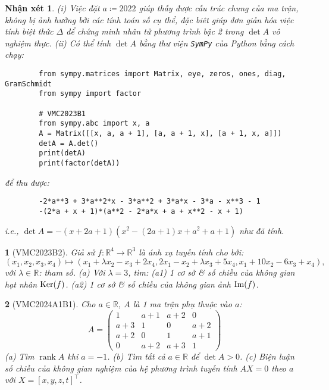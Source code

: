 \documentclass{article}
\newtheorem{baitoan}{}
\newtheorem{nhanxet}{Nhận xét}
\begin{document}
\begin{nhanxet}
	(i) Việc đặt $a\coloneqq2022$ giúp thấy được cấu trúc chung của ma trận, không bị ảnh hưởng bởi các tính toán số cụ thể, đặc biêt giúp đơn giản hóa việc tính biệt thức $\Delta$ để chứng minh nhân tử phương trình bậc 2 trong $\det A$ vô nghiệm thực. (ii) Có thể tính $\det A$ bằng thư viện {\tt SymPy} của Python bằng cách chạy:
	\begin{verbatim}
		from sympy.matrices import Matrix, eye, zeros, ones, diag, GramSchmidt
		from sympy import factor
		
		# VMC2023B1
		from sympy.abc import x, a
		A = Matrix([[x, a, a + 1], [a, a + 1, x], [a + 1, x, a]])
		detA = A.det()
		print(detA)
		print(factor(detA))
	\end{verbatim}
	để thu được:
	\begin{verbatim}
		-2*a**3 + 3*a**2*x - 3*a**2 + 3*a*x - 3*a - x**3 - 1
		-(2*a + x + 1)*(a**2 - 2*a*x + a + x**2 - x + 1)
	\end{verbatim}
	i.e., $\det A = -(x + 2a + 1)(x^2 - (2a + 1)x + a^2 + a + 1)$ như đã tính.
\end{nhanxet}

\begin{baitoan}[VMC2023B2]
	Giả sử $f:\mathbb{R}^4\to\mathbb{R}^3$ là ánh xạ tuyến tính cho bởi:
	\begin{equation*}
		(x_1,x_2,x_3,x_4)\mapsto(x_1 + \lambda x_2 - x_3 + 2x_4,2x_1 - x_2 + \lambda x_3 + 5x_4,x_1 + 10x_2 - 6x_3 + x_4),
	\end{equation*}
	với $\lambda\in\mathbb{R}$: tham số. (a) Với $\lambda = 3$, tìm: (a1) 1 cơ sở \& số chiều của không gian hạt nhân ${\rm Ker}(f)$. (a2) 1 cơ sở \& số chiều của không gian ảnh ${\rm Im}(f)$.
\end{baitoan}

\begin{baitoan}[VMC2024A1B1]
	Cho $a\in\mathbb{R}$, $A$ là 1 ma trận phụ thuộc vào $a$:
	\begin{equation}
		A = \begin{pmatrix}
			1 & a + 1 & a + 2 & 0\\a + 3 & 1 & 0 & a + 2\\a + 2 & 0 & 1 & a + 1\\0 & a + 2 & a + 3 & 1
		\end{pmatrix}
	\end{equation}
	(a) Tìm $\operatorname{rank}A$ khi $a = -1$. (b) Tìm tất cả $a\in\mathbb{R}$ để $\det A > 0$. (c) Biện luận số chiều của không gian nghiệm của hệ phương trình tuyến tính $AX = 0 $ theo $a$ với $X = [x,y,z,t]^\top$.
\end{baitoan}
\end{document}

